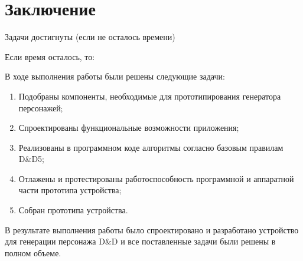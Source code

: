 \documentclass[12pt,a4paper]{article}
\begin{document}
\section{Заключение}

Задачи достигнуты (если не осталось времени)

Если время осталось, то:

В ходе выполнения работы были решены следующие задачи:

\begin{enumerate}
    \item Подобраны компоненты, необходимые для прототипирования генератора персонажей;
    \item Спроектированы функциональные возможности приложения;
    \item Реализованы в программном коде алгоритмы согласно базовым правилам D\&D5;
    \item Отлажены и протестированы работоспособность программной и аппаратной части прототипа устройства;
    \item Собран прототипа устройства.
\end{enumerate}

В результате выполнения работы было спроектировано и разработано устройство для генерации персонажа D\&D и все поставленные задачи были решены в полном объеме.
\end{document}
